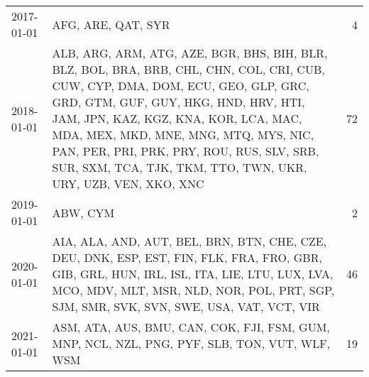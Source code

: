 \begin{tabular}{llr}
2017-01-01 &                                                                                                                                                                                                                                                                                                                                                      AFG, ARE, QAT, SYR &      4 \\
2018-01-01 &  ALB, ARG, ARM, ATG, AZE, BGR, BHS, BIH, BLR, BLZ, BOL, BRA, BRB, CHL, CHN, COL, CRI, CUB, CUW, CYP, DMA, DOM, ECU, GEO, GLP, GRC, GRD, GTM, GUF, GUY, HKG, HND, HRV, HTI, JAM, JPN, KAZ, KGZ, KNA, KOR, LCA, MAC, MDA, MEX, MKD, MNE, MNG, MTQ, MYS, NIC, PAN, PER, PRI, PRK, PRY, ROU, RUS, SLV, SRB, SUR, SXM, TCA, TJK, TKM, TTO, TWN, UKR, URY, UZB, VEN, XKO, XNC &     72 \\
2019-01-01 &                                                                                                                                                                                                                                                                                                                                                                ABW, CYM &      2 \\
2020-01-01 &                                                                                                                                    AIA, ALA, AND, AUT, BEL, BRN, BTN, CHE, CZE, DEU, DNK, ESP, EST, FIN, FLK, FRA, FRO, GBR, GIB, GRL, HUN, IRL, ISL, ITA, LIE, LTU, LUX, LVA, MCO, MDV, MLT, MSR, NLD, NOR, POL, PRT, SGP, SJM, SMR, SVK, SVN, SWE, USA, VAT, VCT, VIR &     46 \\
2021-01-01 &                                                                                                                                                                                                                                                                           ASM, ATA, AUS, BMU, CAN, COK, FJI, FSM, GUM, MNP, NCL, NZL, PNG, PYF, SLB, TON, VUT, WLF, WSM &     19 \\
\bottomrule
\end{tabular}
